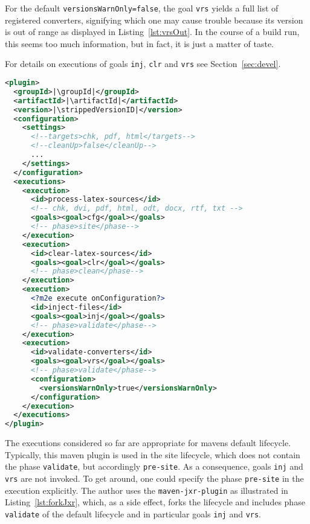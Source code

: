 For the default \texttt{versionsWarnOnly=false}, 
the goal \texttt{vrs} 
yields a full list of registered converters, 
signifying which one may cause trouble 
because its version is out of range
as displayed in Listing~\ref{lst:vrsOut}. 
In the course of a build run, this seems too much information, 
but in fact, it is just a matter of taste. 

For details on executions of goals \texttt{inj}, \texttt{clr} and \texttt{vrs} 
see Section~\ref{sec:devel}. 


\begin{lstlisting}[language=XML, basicstyle=\footnotesize,
escapechar=|,
float, captionpos=hb, label={lst:executions}, 
caption={The executions of this plugin}]
<plugin>
  <groupId>|\groupId|</groupId>
  <artifactId>|\artifactId|</artifactId>
  <version>|\strippedVersionID|</version>
  <configuration>
    <settings>
      <!--targets>chk, pdf, html</targets-->
      <!--cleanUp>false</cleanUp-->
      ...
    </settings>
  </configuration>
  <executions>
    <execution>
      <id>process-latex-sources</id>
      <!-- chk, dvi, pdf, html, odt, docx, rtf, txt -->
      <goals><goal>cfg</goal></goals>
      <!-- phase>site</phase-->
    </execution>
    <execution>
      <id>clear-latex-sources</id>
      <goals><goal>clr</goal></goals>
      <!-- phase>clean</phase-->
    </execution>
    <execution>
      <?m2e execute onConfiguration?>
      <id>inject-files</id>
      <goals><goal>inj</goal></goals>
      <!-- phase>validate</phase-->
    </execution>
    <execution>
      <id>validate-converters</id>
      <goals><goal>vrs</goal></goals>
      <!-- phase>validate</phase-->
      <configuration>
        <versionsWarnOnly>true</versionsWarnOnly>
      </configuration>
    </execution>
  </executions>
</plugin>
\end{lstlisting}

The executions considered so far are appropriate 
for mavens default lifecycle. 
Typically, this maven plugin is used in the site lifecycle, 
which does not contain the phase \texttt{validate}, 
but accordingly \texttt{pre-site}. 
As a consequence, goals \texttt{inj} and \texttt{vrs} are not invoked. 
To get around, 
one could specify the phase \texttt{pre-site} in the execution explicitly. 
The author uses the \texttt{maven-jxr-plugin} 
as illustrated in Listing~\ref{lst:forkJxr}, 
which, as a side effect, forks the lifecycle 
and includes phase \texttt{validate} of the default lifecycle 
and in particular goals \texttt{inj} and \texttt{vrs}. 


